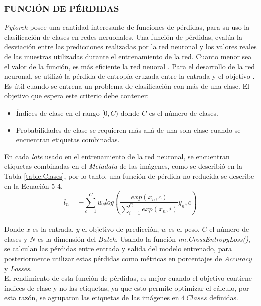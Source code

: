 			\subsubsection{FUNCIÓN DE PÉRDIDAS}		
			
			\textit{Pytorch} posee una cantidad interesante de funciones de pérdidas, para su uso la clasificación de clases en redes neruonales. Una función de pérdidas, evalúa la desviación entre las predicciones realizadas por la red neuronal y los valores reales de las muestras utilizadas durante el entrenamiento de la red. Cuanto menor sea el valor de la función, es más eficiente la red neuoral \cite{mathivet2018inteligencia}. 	
			Para el desarrollo de la red neuronal, se utilizó la pérdida de entropía cruzada entre la entrada y el objetivo \cite{Pytorch}. Es útil cuando se entrena un problema de clasificación con más de una clase.  El objetivo que espera este criterio debe contener:
			
			\begin{itemize}
				\item Índices de clase en el rango $[0,C)$ donde $C$ es el número de clases.
				\item Probabilidades de clase se requieren más allá de una sola clase cuando se encuentran etiquetas combinadas.				 
			\end{itemize}
			
			En cada \textit{lote} usado en el entrenamiento de la red neuronal, se encuentran etiquetas combinadas en el \textit{Metadata} de las imágenes, como se describió en la Tabla \ref{table:Clases}, por lo tanto, una función de pérdida no reducida \cite{Pytorch} se describe en la Ecuación 5-4.\\
			
			\begin{equation}
				{l_n=-\sum_{c=1}^{C}w_c log\left(\frac{exp(x_n,c)}{\sum_{i=1}^{C}exp(x_n,i)}y_n,c\right)}
			\end{equation}\\
			
			Donde $x$ es la entrada, $y$ el objetivo de predicción, $w$ es el peso, $C$ el número de clases y $N$ es la dimensión del \textit{Batch}. Usando la función \textit{nn.CrossEntropyLoss()}, se calculan las pérdidas entre entrada y salida del modelo entrenado, para posteriormente utilizar estas pérdidas como métricas en porcentajes de \textit{Accuracy} y \textit{Losses}.\\
			
			
			El rendimiento de esta función de pérdidas, es mejor cuando el objetivo contiene índices de clase y no las etiquetas, ya que esto permite optimizar el cálculo, por esta razón, se agruparon las etiquetas de las imágenes en $4 \ Clases$ definidas.
			
